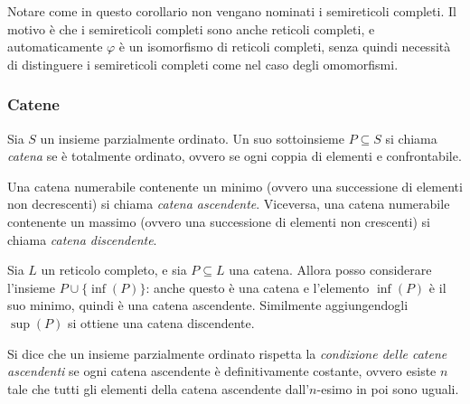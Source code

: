 \documentclass[12pt]{article}
\numberwithin{theorem}{subsection}
\begin{document}
Notare come in questo corollario non vengano nominati i semireticoli completi. Il motivo è che i semireticoli completi sono anche reticoli completi, e automaticamente $\varphi$ è un isomorfismo di reticoli completi, senza quindi necessità di distinguere i semireticoli completi come nel caso degli omomorfismi.

%

\subsubsection{Catene}
\begin{definition}[Catena]
	Sia $S$ un insieme parzialmente ordinato. Un suo sottoinsieme $P \subseteq S$ si chiama \textit{catena} se è totalmente ordinato, ovvero se ogni coppia di elementi e confrontabile.
	
	
	Una catena numerabile contenente un minimo (ovvero una successione di elementi non decrescenti) si chiama \textit{catena ascendente}. Viceversa, una catena numerabile contenente un massimo (ovvero una successione di elementi non crescenti) si chiama \textit{catena discendente}.
\end{definition}

Sia $L$ un reticolo completo, e sia $P \subseteq L$ una catena. Allora posso considerare l'insieme $P \cup \{ \inf(P) \}$: anche questo è una catena e l'elemento $\inf(P)$ è il suo minimo, quindi è una catena ascendente. Similmente aggiungendogli $\sup(P)$ si ottiene una catena discendente.

\begin{definition}
	Si dice che un insieme parzialmente ordinato rispetta la \textit{condizione delle catene ascendenti} se ogni catena ascendente è definitivamente costante, ovvero esiste $n$ tale che tutti gli elementi della catena ascendente dall'$n$-esimo in poi sono uguali.
\end{definition}
\end{document}
